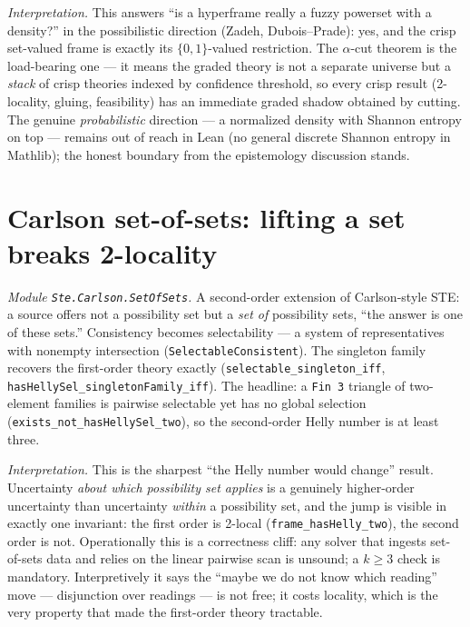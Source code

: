 \documentclass[11pt]{article}
\newcommand{\code}[1]{\texttt{#1}}
\begin{document}
\emph{Interpretation.} This answers ``is a hyperframe really a fuzzy
powerset with a density?'' in the possibilistic direction (Zadeh,
Dubois--Prade): yes, and the crisp set-valued frame is exactly its
$\{0,1\}$-valued restriction.  The $\alpha$-cut theorem is the load-bearing
one --- it means the graded theory is not a separate universe but a
\emph{stack} of crisp theories indexed by confidence threshold, so every
crisp result (2-locality, gluing, feasibility) has an immediate graded
shadow obtained by cutting.  The genuine \emph{probabilistic} direction ---
a normalized density with Shannon entropy on top --- remains out of reach
in Lean (no general discrete Shannon entropy in Mathlib); the honest
boundary from the epistemology discussion stands.

\section{Carlson set-of-sets: lifting a set breaks 2-locality}
\emph{Module \code{Ste.Carlson.SetOfSets}.}
A second-order extension of Carlson-style STE: a source offers not a
possibility set but a \emph{set of} possibility sets, ``the answer is one
of these sets.''  Consistency becomes selectability --- a system of
representatives with nonempty intersection (\code{SelectableConsistent}).
The singleton family recovers the first-order theory exactly
(\code{selectable\_singleton\_iff},
\code{hasHellySel\_singletonFamily\_iff}).  The headline: a \code{Fin 3}
triangle of two-element families is pairwise selectable yet has no global
selection (\code{exists\_not\_hasHellySel\_two}), so the second-order
Helly number is at least three.

\emph{Interpretation.} This is the sharpest ``the Helly number would
change'' result.  Uncertainty \emph{about which possibility set applies}
is a genuinely higher-order uncertainty than uncertainty \emph{within} a
possibility set, and the jump is visible in exactly one invariant: the
first order is 2-local (\code{frame\_hasHelly\_two}), the second order is
not.  Operationally this is a correctness cliff: any solver that ingests
set-of-sets data and relies on the linear pairwise scan is unsound; a
$k\geq 3$ check is mandatory.  Interpretively it says the ``maybe we do
not know which reading'' move --- disjunction over readings --- is not
free; it costs locality, which is the very property that made the
first-order theory tractable.
\end{document}
